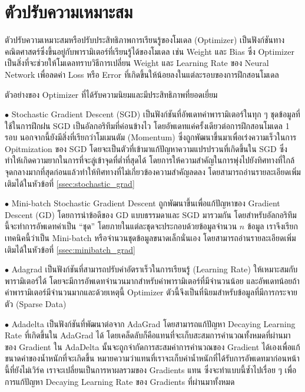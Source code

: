 \section{ตัวปรับความเหมาะสม}
\label{sec:optimizer}

ตัวปรับความเหมาะสมหรือปรับประสิทธิภาพการเรียนรู้ของโมเดล (Optimizer) เป็นฟังก์ชันทางคณิตศาสตร์ซึ่งขึ้นอยู่กับพารามิเตอร์ที่เรียนรู้ได้ของโมเดล เช่น Weight และ Bias ซึ่ง Optimizer เป็นสิ่งที่จะช่วยให้โมเดลทราบวิธีการเปลี่ยน Weight และ Learning Rate ของ Neural Network เพื่อลดค่า Loss หรือ Error ที่เกิดขึ้นให้น้อยลงในแต่ละรอบของการฝึกสอนโมเดล

\noindent ตัวอย่างของ Optimizer ที่ได้รับความนิยมและมีประสิทธิภาพที่ยอดเยี่ยม

\noindent $\bullet$ Stochastic Gradient Descent (SGD) เป็นฟังก์ชันที่อัพเดทค่าพารามิเตอร์ในทุก ๆ ชุดข้อมูลที่ใช้ในการฝึกฝน SGD เป็นอัลกอริทึมที่ค่อนข้างไว โดยอัพเดทแค่ครั้งเดียวต่อการฝึกสอนโมเดล 1 รอบ นอกจากนี้ยังมีสิ่งที่เรียกว่าโมเมนตัม (Momentum) ซึ่งถูกพัฒนาขึ้นมาเพื่อเร่งความเร็วในการ Opitmization ของ SGD โดยจะเป็นตัวที่เข้ามาแก้ปัญหาความแปรปรวนที่เกิดขึ้นใน SGD ซึ่งทำให้เกิดความยากในการที่จะลู่เข้าจุดที่ต่ำที่สุดได้ โดยการให้ความสำคัญในการพุ่งไปยังทิศทางที่ใกล้จุดกลางมากที่สุดก่อนแล้วทำให้ทิศทางที่ไม่เกี่ยวข้องความสำคัญลดลง โดยสามารถอ่านรายละเอียดเพิ่มเติมได้ในหัวข้อที่ \ref{ssec:stochastic_grad}

\noindent $\bullet$ Mini-batch Stochastic Gradient Descent ถูกพัฒนาขึ้นเพื่อแก้ปัญหาของ Gradient Descent (GD) โดยการนำข้อดีของ GD แบบธรรมดาและ SGD มารวมกัน โดยสำหรับอัลกอริทึมนี้จะทำการอัพเดทค่าเป็น \enquote{ชุด} โดยภายในแต่ละชุดจะประกอบด้วยข้อมูลจำนวน $n$ ข้อมูล เราจึงเรียกเทคนิคนี้ว่าเป็น Mini-batch หรือจำนวนชุดข้อมูลขนาดเล็กนั่นเอง โดยสามารถอ่านรายละเอียดเพิ่มเติมได้ในหัวข้อที่ \ref{ssec:minibatch_grad}

\noindent $\bullet$ Adagrad เป็นฟังก์ชันที่สามารถปรับค่าอัตราเร็วในการเรียนรู้ (Learning Rate) ให้เหมาะสมกับพารามิเตอร์ได้ โดยจะมีการอัพเดทจำนวนมากสำหรับค่าพารามิเตอร์ที่มีจำนวนน้อย และอัพเดทน้อยถ้าค่าพารามิเตอร์มีจำนวนมากและด้วยเหตุนี้ Optimizer ตัวนี้จึงเป็นที่นิยมสำหรับข้อมูลที่มีการกระจายตัว (Sparse Data)

\noindent $\bullet$ Adadelta เป็นฟังก์ชันที่พัฒนาต่อจาก AdaGrad โดยสามารถแก้ปัญหา Decaying Learning Rate ที่เกิดขึ้นใน AdaGrad ได้ โดยเคล็ดลับก็คือแทนที่จะเก็บสะสมการคำนวณทั้งหมดที่ผ่านมาของ Gradient ใน AdaDelta นั้นจะถูกจำกัดการสะสมค่าการคำนวณของ Gradient ได้เองเพื่อแก้ขนาดค่าของน้ำหนักที่จะเกิดขึ้น หมายความว่าแทนที่เราจะเก็บค่าน้ำหนักที่ได้รับการอัพเดทมาก่อนหน้านี้ที่ยังไม่เวิร์ค เราจะเปลี่ยนเป็นการหาผลรวมของ Gradients แทน ซึ่งจะทำแบบนี้ซ้ำไปเรื่อย ๆ เพื่อการแก้ปัญหา Decaying Learning Rate ของ Gradients ที่ผ่านมาทั้งหมด

